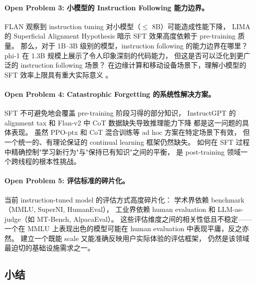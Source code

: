 \begin{openproblembox}
\paragraph{Open Problem 3: 小模型的 Instruction Following 能力边界。}
FLAN 观察到 instruction tuning 对小模型（$\leq$ 8B）可能造成性能下降，
LIMA 的 Superficial Alignment Hypothesis 暗示 SFT 效果高度依赖于 pre-training 质量。
那么，对于 1B--3B 级别的模型，instruction following 的能力边界在哪里？
phi-1 在 1.3B 规模上展示了令人印象深刻的代码能力，
但这是否可以泛化到更广泛的 instruction following 场景？
在边缘计算和移动设备场景下，理解小模型的 SFT 效率上限具有重大实际意义
。
\end{openproblembox}

\begin{openproblembox}
\paragraph{Open Problem 4: Catastrophic Forgetting 的系统性解决方案。}
SFT 不可避免地会覆盖 pre-training 阶段习得的部分知识，
InstructGPT 的 alignment tax 和 Flan-v2 中 CoT 数据缺失导致推理能力下降
都是这一问题的具体表现。
虽然 PPO-ptx 和 CoT 混合训练等 ad hoc 方案在特定场景下有效，
但一个统一的、有理论保证的 continual learning 框架仍然缺失。
如何在 SFT 过程中精确控制"学习新行为"与"保持已有知识"之间的平衡，
是 post-training 领域一个跨线程的根本性挑战。
\end{openproblembox}

\begin{openproblembox}
\paragraph{Open Problem 5: 评估标准的碎片化。}
当前 instruction-tuned model 的评估方式高度碎片化：
学术界依赖 benchmark（MMLU, SuperNI, HumanEval），
工业界依赖 human evaluation 和 LLM-as-judge（如 MT-Bench, AlpacaEval）。
这些评估维度之间的相关性低且不稳定——
一个在 MMLU 上表现出色的模型可能在 human evaluation 中表现平庸，反之亦然。
建立一个既能 scale 又能准确反映用户实际体验的评估框架，
仍然是该领域最迫切的基础设施需求之一。
\end{openproblembox}


\subsection{小结}
\label{sec:t1-summary}

